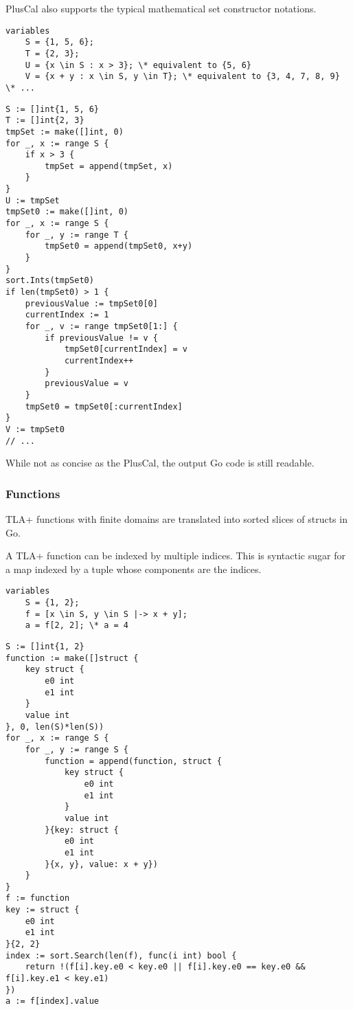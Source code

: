PlusCal also supports the typical mathematical set constructor notations.

\noindent
\begin{minipage}[t]{\textwidth}
\begin{lstlisting}[language=pcal]
variables
	S = {1, 5, 6};
	T = {2, 3};
	U = {x \in S : x > 3}; \* equivalent to {5, 6}
	V = {x + y : x \in S, y \in T}; \* equivalent to {3, 4, 7, 8, 9}
\* ...
\end{lstlisting}
\end{minipage}

\noindent
\begin{minipage}[t]{\textwidth}
\begin{lstlisting}[language=golang]
S := []int{1, 5, 6}
T := []int{2, 3}
tmpSet := make([]int, 0)
for _, x := range S {
	if x > 3 {
		tmpSet = append(tmpSet, x)
	}
}
U := tmpSet
tmpSet0 := make([]int, 0)
for _, x := range S {
	for _, y := range T {
		tmpSet0 = append(tmpSet0, x+y)
	}
}
sort.Ints(tmpSet0)
if len(tmpSet0) > 1 {
	previousValue := tmpSet0[0]
	currentIndex := 1
	for _, v := range tmpSet0[1:] {
		if previousValue != v {
			tmpSet0[currentIndex] = v
			currentIndex++
		}
		previousValue = v
	}
	tmpSet0 = tmpSet0[:currentIndex]
}
V := tmpSet0
// ...
\end{lstlisting}
\end{minipage}

While not as concise as the PlusCal, the output Go code is still readable.

\subsubsection{Functions}
TLA+ functions with finite domains are translated into sorted slices of structs in Go.

A TLA+ function can be indexed by multiple indices. This is syntactic sugar for a map indexed by a tuple whose components are the indices.

\noindent
\begin{minipage}[t]{\textwidth}
\begin{lstlisting}[language=pcal]
variables
	S = {1, 2};
	f = [x \in S, y \in S |-> x + y];
	a = f[2, 2]; \* a = 4
\end{lstlisting}
\end{minipage}

\noindent
\begin{minipage}[t]{\textwidth}
\begin{lstlisting}[language=golang]
S := []int{1, 2}
function := make([]struct {
	key struct {
		e0 int
		e1 int
	}
	value int
}, 0, len(S)*len(S))
for _, x := range S {
	for _, y := range S {
		function = append(function, struct {
			key struct {
				e0 int
				e1 int
			}
			value int
		}{key: struct {
			e0 int
			e1 int
		}{x, y}, value: x + y})
	}
}
f := function
key := struct {
	e0 int
	e1 int
}{2, 2}
index := sort.Search(len(f), func(i int) bool {
	return !(f[i].key.e0 < key.e0 || f[i].key.e0 == key.e0 && f[i].key.e1 < key.e1)
})
a := f[index].value
\end{lstlisting}
\end{minipage}

